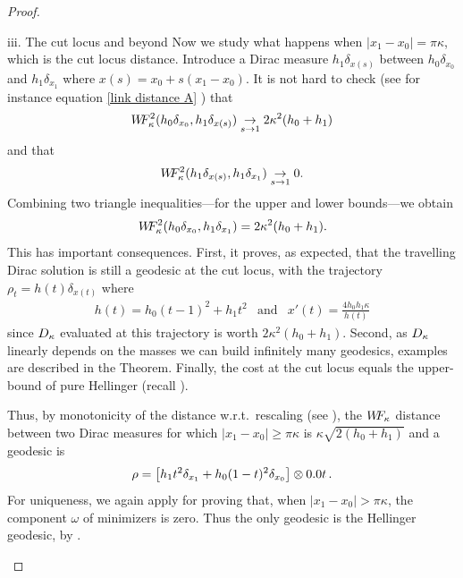 \begin{proof}
\begin{paragraph}{iii. The cut locus and beyond}
Now we study what happens when $\vert x_1 -x_0 \vert= \pi \kappa$, which is the cut locus distance. 
Introduce a Dirac measure $h_1 \delta_{x(s)}$ between $h_0\delta_{x_0}$ and $h_1\delta_{x_1}$ where $x(s)=x_0 + s (x_1-x_0)$. It is not hard to check (see for instance equation \eqref{link distance A} ) that 
\[
W\! \! F^2_{\kappa}(h_0\delta_{x_0},h_1\delta_{x(s)}) \underset{s \rightarrow 1}{\rightarrow} 2\kappa^2 (h_0+h_1)
\]
 and that 
 \[
 W\! \! F^2_{\kappa}(h_1\delta_{x(s)},h_1\delta_{x_1}) \underset{s \rightarrow 1}{\rightarrow} 0 .
 \]
Combining two triangle inequalities---for the upper and lower bounds---we obtain
\[
W\! \! F^2_{\kappa}(h_0\delta_{x_0},h_1\delta_{x_1}) = 2\kappa^2(h_0+h_1).
\]
This has important consequences. First, it proves, as expected, that the travelling Dirac solution is still a geodesic at the cut locus, with the trajectory $\rho_t=h(t)\delta_{x(t)}$ where
\begin{eqnarray*}
h(t)=h_0(t-1)^2+h_1t^2& \text{and} &
x'(t) = \frac{4 h_0 h_1 \kappa}{h(t)}
\end{eqnarray*}
since $D_{\kappa}$ evaluated at this trajectory is worth $2\kappa^2(h_0+h_1)$.
Second, as $D_{\kappa}$ linearly depends on the masses we can build infinitely many geodesics, examples are described in the Theorem. Finally, the cost at the cut locus equals the upper-bound of pure Hellinger (recall ). 


Thus, by monotonicity of the distance w.r.t.\ rescaling (see ), the $W\! \! F_{\kappa}$ distance between two Dirac measures for which $|x_1-x_0|\geq \pi \kappa$ is $\kappa\sqrt{2(h_0+h_1)}$ and a geodesic is
\[
\rho = \left[ h_1 t^2\delta_{x_1}+h_0(1-t)^2\delta_{x_0}\right] \otimes \d t \, .
\]
For uniqueness, we again apply  for proving that, when $|x_1-x_0|> \pi \kappa$, the component $\omega$ of minimizers is zero. Thus the only geodesic is the Hellinger geodesic, by .
\end{paragraph}
\item


\end{proof}
